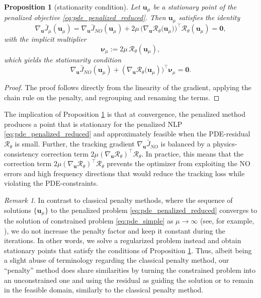 \documentclass[final,1p,times]{elsarticle}
\theoremstyle{plain} %
\newtheorem{proposition}[theorem]{Proposition}
\theoremstyle{definition} %
\theoremstyle{remark} %
\newtheorem{remark}[theorem]{Remark}
\begin{document}
\begin{proposition}[stationarity condition]\label{prop:penalty_kkt_like}
Let $\mathbf{u}_\mu$ be a stationary point of the penalized objective
\eqref{eq:pde_penalized_reduced}. Then $\mathbf{u}_\mu$ satisfies the identity
\begin{equation}\label{eq:grad_decomposition}
\nabla_{\mathbf{u}} \bar{J}_{\mu}(\mathbf{u}_\mu)
=
\nabla_{\mathbf{u}} \bar{J}_{NO}(\mathbf{u}_\mu)
+2\mu\,\Big({\nabla_{\mathbf{u}}\mathcal{R}_\theta(\mathbf{u}_\mu})\Big)^\top \mathcal{R}_\theta(\mathbf{u}_\mu)
=\mathbf{0},
\end{equation}
with the implicit multiplier
\begin{equation}\label{eq:implicit_multiplier}
\boldsymbol{\nu}_\mu := 2\mu\,\mathcal{R}_\theta(\mathbf{u}_\mu),
\end{equation}
which yields the stationarity condition
\begin{equation}\label{eq:kkt_like_stationarity}
\nabla_{\mathbf{u}} \bar{J}_{NO}(\mathbf{u}_\mu) + ({\nabla_{\mathbf{u}}\mathcal{R}_\theta(\mathbf{u}_\mu}))^\top \boldsymbol{\nu}_\mu = \mathbf{0}.
\end{equation}
\end{proposition}
\begin{proof}
The proof follows directly from the linearity of the gradient, applying the chain rule on the penalty, and regrouping and renaming the terms.
\end{proof}
The implication of Proposition \ref{prop:penalty_kkt_like} is that at convergence, the penalized method produces a point that is stationary for the penalized NLP \eqref{eq:pde_penalized_reduced} and approximately feasible when the PDE-residual $\mathcal{R}_\theta$ is small. Further, the tracking gradient $\nabla_\mathbf{u}\bar{J}_{NO}$ is balanced by a physics-consistency correction term $2\mu(\nabla_{\mathbf{u}}\mathcal{R}_\theta)^\top \mathcal{R}_\theta$. In practice, this means that the correction term $2\mu(\nabla_{\mathbf{u}}\mathcal{R}_\theta)^\top \mathcal{R}_\theta$ prevents the optimizer from exploiting the NO errors and high frequency directions that would reduce the tracking loss while violating the PDE-constraints. 

\begin{remark}\label{remark:penalty}
In contrast to classical penalty methods, where the sequence of solutions $\{\mathbf{u}_\mu\}$ to the penalized problem \eqref{eq:pde_penalized_reduced} converges to the solution of constrained problem \eqref{eq:pde_simple} as $\mu\to\infty$ (see, for example, \cite{bazaraa2006nonlinear}), we do not increase the penalty factor and keep it constant during the iterations. In other words, we solve a regularized problem instead and obtain stationary points that satisfy the conditions of Proposition \ref{prop:penalty_kkt_like}. Thus, 
 albeit being a slight abuse of terminology regarding the classical penalty method, our ``penalty'' method does share similarities by turning the constrained problem into an unconstrained one and using the residual as guiding the solution or to remain in the feasible domain, similarly to the classical penalty method.
\end{remark}
\end{document}

